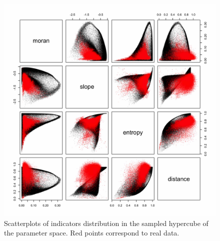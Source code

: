 \begin{figure}
\includegraphics[width=\textwidth]{figuresraw/scatter}
\caption{Scatterplots of indicators distribution in the sampled hypercube of the parameter space. Red points correspond to real data.}
\label{fig:densityscatter}
\end{figure}








